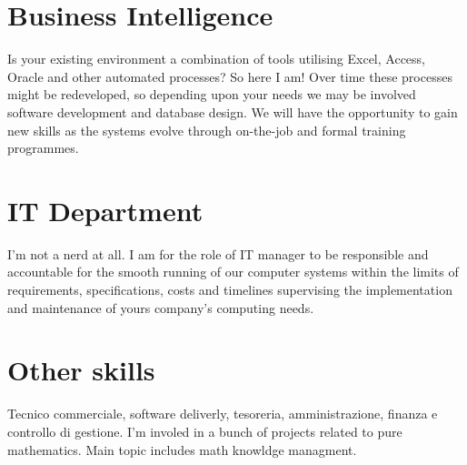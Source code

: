 \documentclass{article}
\begin{document}
		\section*{Business Intelligence}
		Is your existing environment a combination of tools utilising Excel, Access, Oracle and other automated processes? So here I am! Over time these processes might be redeveloped, so depending upon your needs we may be involved software development and database design. We will have the opportunity to gain new skills as the systems evolve through on-the-job and formal training programmes.
	
		\section*{IT Department}
		I'm not a nerd at all. I am for the role of IT manager to be responsible and accountable for the smooth running of our computer systems within the limits of requirements, specifications, costs and timelines supervising the implementation and maintenance of yours company’s computing needs.
		
		\section*{Other skills}
		Tecnico commerciale, software deliverly, tesoreria, amministrazione, finanza e controllo di gestione.
		\medskip
		I'm involed in a bunch of projects related to pure mathematics. Main topic includes math knowldge managment.		
\end{document}
